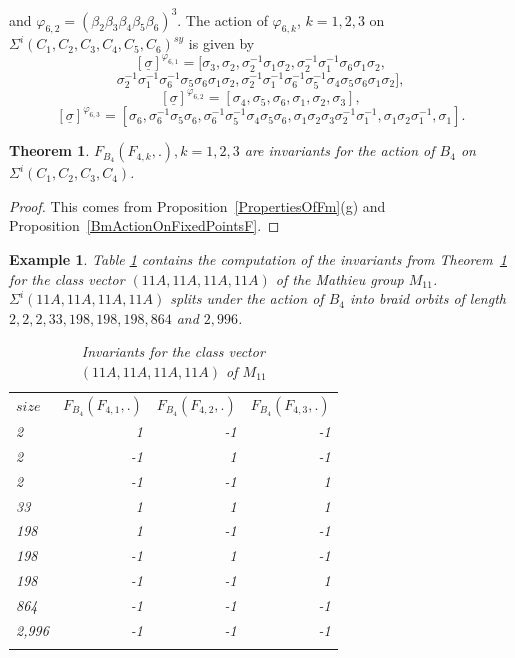 \documentclass[12pt,a4paper]{article}
\newtheorem{theorem}{Theorem}[section]
\newtheorem{example}{Example}[section]
\numberwithin{equation}{section}
\numberwithin{table}{section}
\begin{document}
and $\varphi_{6,2} = (\beta_2 \beta_3 \beta_4 \beta_5 \beta_6)^3$.
The action of $\varphi_{6,k}$, $k=1,2,3$ on $\Sigma^i(C_1,C_2,C_3,C_4,C_5,C_6)^{sy}$ is given by
$$[\underline{\sigma}]^{\varphi_{6,1}} = [\sigma_3, \sigma_2, \sigma^{-1}_2 \sigma_1 \sigma_2,
\sigma^{-1}_2 \sigma^{-1}_1 \sigma_6 \sigma_1 \sigma_2,$$
$$\sigma^{-1}_2 \sigma^{-1}_1 \sigma^{-1}_6 \sigma_5 \sigma_6 \sigma_1 \sigma_2, 
\sigma^{-1}_2 \sigma^{-1}_1 \sigma^{-1}_6 \sigma^{-1}_5 \sigma_4 \sigma_5 \sigma_6 \sigma_1 \sigma_2],$$
$$[\underline{\sigma}]^{\varphi_{6,2}} = [\sigma_4,\sigma_5,\sigma_6,\sigma_1,\sigma_2,\sigma_3],$$
$$[\underline{\sigma}]^{\varphi_{6,3}} = [\sigma_6, \sigma^{-1}_6 \sigma_5 \sigma_6,
\sigma^{-1}_6 \sigma^{-1}_5 \sigma_4 \sigma_5 \sigma_6,
\sigma_1 \sigma_2 \sigma_3 \sigma^{-1}_2 \sigma^{-1}_1, \sigma_1 \sigma_2 \sigma^{-1}_1, \sigma_1].$$
%
\begin{theorem}
\label{BraidInvariants}
$F_{B_4}(F_{4,k},.), k=1,2,3$ are invariants for the action of $B_4$ on $\Sigma^i(C_1,C_2,C_3,C_4)$.
\end{theorem}
\begin{proof}
This comes from Proposition~\ref{PropertiesOfFm}(g) and Proposition~\ref{BmActionOnFixedPointsF}.
\end{proof}
%
\begin{example}
\label{M11_11A11A11A11A}
Table \ref{tab:Data_M11_11A11A11A11A} contains the computation of the invariants from
Theorem~\ref{BraidInvariants} for the class vector $(11A,11A,11A,11A)$ of the Mathieu group $M_{11}$.
$\Sigma^i(11A,11A,11A,11A)$ splits under the action of $B_4$ into braid orbits of length
$2, 2, 2, 33, 198, 198, 198, 864$ and $2,996$.
%
\begin{table}[!htbp]
\centering
\footnotesize
\captionsetup{font=footnotesize}
\caption{Invariants for the class vector $(11A,11A,11A,11A)$ of $M_{11}$}
\label{tab:Data_M11_11A11A11A11A}
\begin{tabular}{lrrr}
\hline\noalign{\smallskip}
$size$ & $F_{B_4}(F_{4,1},.)$ & $F_{B_4}(F_{4,2},.)$ & $F_{B_4}(F_{4,3},.)$ \\
\noalign{\smallskip}\hline\noalign{\smallskip}
2 & 1 & -1 & -1 \\
2 & -1 & 1 & -1 \\
2 & -1 & -1 & 1 \\
33 & 1 & 1 & 1 \\
198 & 1 & -1 & -1 \\
198 & -1 & 1 & -1 \\
198 & -1 & -1 & 1 \\
864 & -1 & -1 & -1 \\
2,996 & -1 & -1 & -1 \\
\noalign{\smallskip}\hline
\end{tabular}
\end{table}
\end{example}
\end{document}
